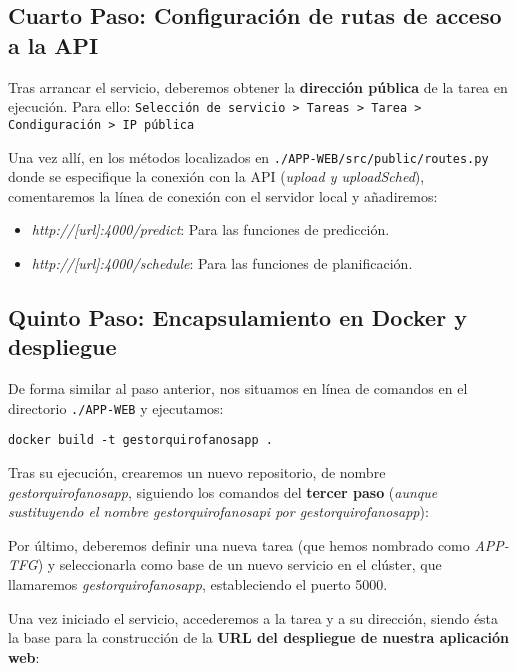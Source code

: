 \subsection{Cuarto Paso: Configuración de rutas de acceso a la API}

Tras arrancar el servicio, deberemos obtener la \textbf{dirección pública} de la tarea en ejecución. Para ello: \texttt{Selección de servicio > Tareas > Tarea > Condiguración > IP pública}


Una vez allí, en los métodos localizados en \texttt{./APP-WEB/src/public/routes.py} donde se especifique la conexión con la API  (\textit{upload y uploadSched}), comentaremos la línea de conexión con el servidor local y añadiremos:

\begin{itemize}
    \item \textit{http://[url]:4000/predict}: Para las funciones de predicción.
    \item \textit{http://[url]:4000/schedule}: Para las funciones de planificación.
\end{itemize}


\subsection{Quinto Paso: Encapsulamiento en Docker y despliegue}

De forma similar al paso anterior, nos situamos en línea de comandos en el directorio \texttt{./APP-WEB} y ejecutamos:

\texttt{docker build -t gestorquirofanosapp .}

Tras su ejecución, crearemos un nuevo repositorio, de nombre \textit{gestorquirofanosapp}, siguiendo los comandos del \textbf{tercer paso} (\textit{aunque sustituyendo el nombre gestorquirofanosapi por gestorquirofanosapp}):


Por último, deberemos definir una nueva tarea (que hemos nombrado como \textit{APP-TFG}) y seleccionarla como base de un nuevo servicio en el clúster, que llamaremos \textit{gestorquirofanosapp}, estableciendo el puerto 5000.

Una vez iniciado el servicio, accederemos a la tarea y a su dirección, siendo ésta la base para la construcción de la \textbf{URL del despliegue de nuestra aplicación web}:

